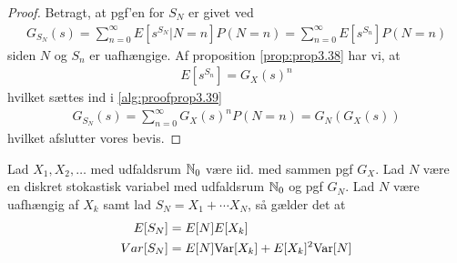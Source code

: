 \begin{proof}
Betragt, at pgf'en for $S_N$ er givet ved
    \begin{align}\label{alg:proofprop3.39}
        G_{S_N}(s)=\sum_{n=0}^{\infty}E\left[s^{S_N} | N=n\right]P(N=n)=\sum_{n=0}^{\infty}E[s^{S_n}]P(N=n)
    \end{align}
siden $N$ og $S_n$ er uafhængige. Af proposition \ref{prop:prop3.38} har vi, at 
    \begin{align*}
        E[s^{S_n}]=G_X(s)^n 
    \end{align*}
    hvilket sættes ind i \eqref{alg:proofprop3.39}
    \begin{align*}
        G_{S_N}(s)=\sum_{n=0}^{\infty} G_X(s)^nP(N=n)=G_N(G_X(s)) 
    \end{align*}
    hvilket afslutter vores bevis.
\end{proof}
\begin{prop} \label{prop:cor 3.13} %
Lad $X_1,X_2,\ldots$ med udfaldsrum $\mathbb{N}_0$ være iid. med sammen pgf $G_X$. Lad $N$ være en diskret stokastisk variabel med udfaldsrum $\mathbb{N}_0$ og pgf $G_N$. Lad $N$ være uafhængig af $X_k$ samt lad $S_N=X_1+\cdots X_N$, så gælder det at 
\begin{align*}
    E[S_N] &=E[N]E[X_k] \\
    Var[S_N] &=E[N]\textnormal{Var}[X_k]+E[X_k]^2\textnormal{Var}[N]
\end{align*}
\end{prop}

